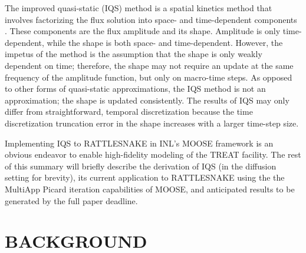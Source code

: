 \documentclass[12pt]{article}
\begin{document}
The improved quasi-static (IQS) method is a spatial kinetics method that involves factorizing the flux solution into space- and time-dependent components \cite{Ott_1966,Dulla2008}.  These components are the flux amplitude and its shape. Amplitude is only time-dependent, while the shape is both space- and time-dependent.  However, the impetus of the method is the assumption that the shape is only weakly dependent on time; therefore, the shape may not require an update at the same frequency of the amplitude function, but only on macro-time steps. As opposed to other forms of quasi-static approximations, the IQS method is not an approximation; the shape is updated consistently.  The results of IQS may only differ from straightforward, temporal discretization because the time discretization truncation error in the shape increases with a larger time-step size. 

Implementing IQS to RATTLESNAKE in INL's MOOSE framework is an obvious endeavor to enable high-fidelity modeling of the TREAT facility. The rest of this summary will briefly describe the derivation of IQS (in the diffusion setting for brevity), its current application to RATTLESNAKE using the the MultiApp Picard iteration capabilities of MOOSE, and anticipated results to be generated by the full paper deadline.

%
\section{BACKGROUND}
\label{sect::background}
\end{document}
